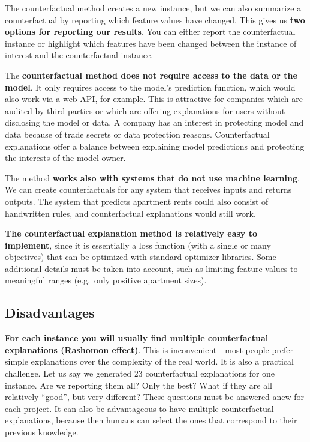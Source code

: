 \documentclass[12pt,]{krantz}
\begin{document}
The counterfactual method creates a new instance, but we can also
summarize a counterfactual by reporting which feature values have
changed. This gives us \textbf{two options for reporting our results}.
You can either report the counterfactual instance or highlight which
features have been changed between the instance of interest and the
counterfactual instance.

The \textbf{counterfactual method does not require access to the data or
the model}. It only requires access to the model's prediction function,
which would also work via a web API, for example. This is attractive for
companies which are audited by third parties or which are offering
explanations for users without disclosing the model or data. A company
has an interest in protecting model and data because of trade secrets or
data protection reasons. Counterfactual explanations offer a balance
between explaining model predictions and protecting the interests of the
model owner.

The method \textbf{works also with systems that do not use machine
learning}. We can create counterfactuals for any system that receives
inputs and returns outputs. The system that predicts apartment rents
could also consist of handwritten rules, and counterfactual explanations
would still work.

\textbf{The counterfactual explanation method is relatively easy to
implement}, since it is essentially a loss function (with a single or
many objectives) that can be optimized with standard optimizer
libraries. Some additional details must be taken into account, such as
limiting feature values to meaningful ranges (e.g.~only positive
apartment sizes).

\subsection{Disadvantages}\label{disadvantages-14}

\textbf{For each instance you will usually find multiple counterfactual
explanations (Rashomon effect)}. This is inconvenient - most people
prefer simple explanations over the complexity of the real world. It is
also a practical challenge. Let us say we generated 23 counterfactual
explanations for one instance. Are we reporting them all? Only the best?
What if they are all relatively ``good'', but very different? These
questions must be answered anew for each project. It can also be
advantageous to have multiple counterfactual explanations, because then
humans can select the ones that correspond to their previous knowledge.
\end{document}
